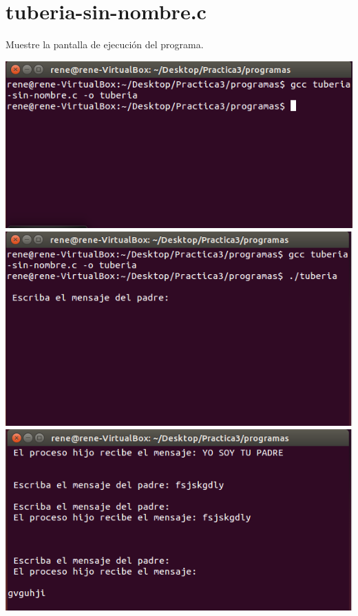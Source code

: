 \section{tuberia-sin-nombre.c}

	Muestre la pantalla de ejecución del programa.

	\begin{center}
		\includegraphics[scale=0.15]{imagenes/Captura.png}
		\includegraphics[scale=0.15]{imagenes/Captura2.png}
		\includegraphics[scale=0.15]{imagenes/Captura3.png}

\end{center}
